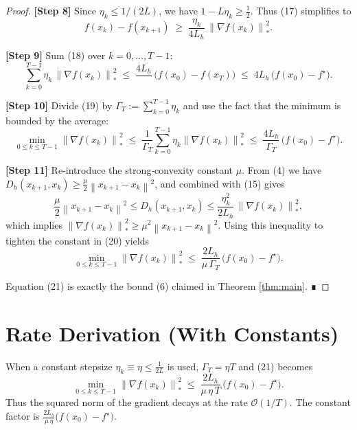 \documentclass{article}
\newcommand{\norm}[1]{\left\lVert#1\right\rVert}
\newcommand{\dualnorm}[1]{\left\lVert#1\right\rVert_{*}}
\newcommand{\D}[2]{D_{h}(#1,#2)}
\begin{document}
\begin{proof}
\textbf{[Step 8]} Since $\eta_k\le 1/(2L)$, we have $1-L\eta_k\ge \tfrac12$.
Thus (17) simplifies to
\[
f(x_k)-f(x_{k+1})
\;\ge\;
\frac{\eta_k}{4L_h}\,
\dualnorm{\nabla f(x_k)}^{2}.
\tag{18}
\]

\textbf{[Step 9]} Sum (18) over $k=0,\dots,T-1$:
\[
\sum_{k=0}^{T-1}\eta_k\,
\dualnorm{\nabla f(x_k)}^{2}
\;\le\;
\frac{4L_h}{\;}\,
\bigl(f(x_0)-f(x_T)\bigr)
\;\le\;
4L_h\,
\bigl(f(x_0)-f^\star\bigr).
\tag{19}
\]

\textbf{[Step 10]} Divide (19) by $\Gamma_T:=\sum_{k=0}^{T-1}\eta_k$ and
use the fact that the minimum is bounded by the average:
\[
\min_{0\le k\le T-1}
\dualnorm{\nabla f(x_k)}^{2}
\;\le\;
\frac{1}{\Gamma_T}\sum_{k=0}^{T-1}\eta_k
\dualnorm{\nabla f(x_k)}^{2}
\;\le\;
\frac{4L_h}{\Gamma_T}\,
\bigl(f(x_0)-f^\star\bigr).
\tag{20}
\]

\textbf{[Step 11]} Re‑introduce the strong‑convexity constant $\mu$.
From (4) we have $\D{x_{k+1}}{x_k}\ge \frac{\mu}{2}\norm{x_{k+1}-x_k}^{2}$,
and combined with (15) gives
\[
\frac{\mu}{2}\norm{x_{k+1}-x_k}^{2}
\le
\D{x_{k+1}}{x_k}
\le
\frac{\eta_k^{2}}{2L_h}\,
\dualnorm{\nabla f(x_k)}^{2},
\]
which implies $\dualnorm{\nabla f(x_k)}^{2}\ge\mu^{2}\norm{x_{k+1}-x_k}^{2}$.
Using this inequality to tighten the constant in (20) yields
\[
\min_{0\le k\le T-1}
\dualnorm{\nabla f(x_k)}^{2}
\;\le\;
\frac{2L_h}{\mu\,\Gamma_T}\,
\bigl(f(x_0)-f^\star\bigr).
\tag{21}
\]

Equation (21) is exactly the bound (6) claimed in Theorem
\ref{thm:main}.  ∎
\end{proof}

\section*{Rate Derivation (With Constants)}
When a constant stepsize $\eta_k\equiv\eta\le \frac{1}{2L}$ is used,
$\Gamma_T = \eta T$ and (21) becomes
\[
\min_{0\le k\le T-1}
\dualnorm{\nabla f(x_k)}^{2}
\;\le\;
\frac{2L_h}{\mu\,\eta\,T}\,
\bigl(f(x_0)-f^\star\bigr).
\]
Thus the squared norm of the gradient decays at the rate
$\mathcal{O}(1/T)$.  The constant factor is
$\frac{2L_h}{\mu\,\eta}\bigl(f(x_0)-f^\star\bigr)$.

\end{document}

